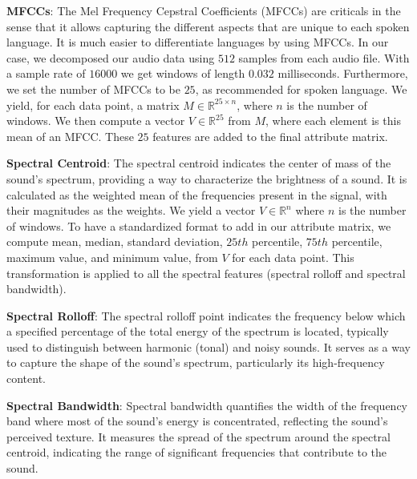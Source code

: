 \documentclass[twocolumn]{article}
\newcommand{\R}{\mathbb{R}}
\begin{document}
\textbf{MFCCs}:
The Mel Frequency Cepstral Coefficients (MFCCs) are criticals in the sense that it allows capturing the different aspects that are unique to each spoken language. It is much easier to differentiate languages by using MFCCs. In our case, we decomposed our audio data using $512$ samples from each audio file. With a sample rate of $16000$ we get windows of length $0.032$ milliseconds. Furthermore, we set the number of MFCCs to be $25$, as recommended for spoken language. We yield, for each data point, a matrix $M \in \R^{25 \times n}$, where $n$ is the number of windows. We then compute a vector $V \in \R^{25}$ from $M$, where each element is this mean of an MFCC. These $25$ features are added to the final attribute matrix. 

\textbf{Spectral Centroid}: The spectral centroid indicates the center of mass of the sound's spectrum, providing a way to characterize the brightness of a sound. It is calculated as the weighted mean of the frequencies present in the signal, with their magnitudes as the weights. We yield a vector $V \in \R^{n}$ where $n$ is the number of windows. To have a standardized format to add in our attribute matrix, we compute mean, median, standard deviation, $25th$ percentile, $75th$ percentile, maximum value, and minimum value, from $V$ for each data point. This transformation is applied to all the spectral features (spectral rolloff and spectral bandwidth). 

\textbf{Spectral Rolloff}: The spectral rolloff point indicates the frequency below which a specified percentage of the total energy of the spectrum is located, typically used to distinguish between harmonic (tonal) and noisy sounds. It serves as a way to capture the shape of the sound's spectrum, particularly its high-frequency content.

\textbf{Spectral Bandwidth}: Spectral bandwidth quantifies the width of the frequency band where most of the sound's energy is concentrated, reflecting the sound's perceived texture. It measures the spread of the spectrum around the spectral centroid, indicating the range of significant frequencies that contribute to the sound.
\end{document}
